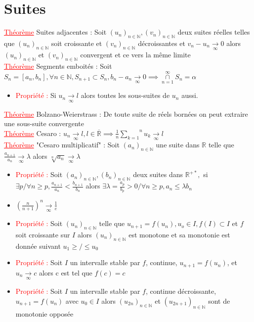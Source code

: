 \documentclass[a4paper, 11pts, french]{article}
\newcommand{\R}{\mathbb{R}}
\newcommand{\N}{\mathbb{N}}
\newcommand{\al}{\alpha}
\newcommand{\la}{\lambda}
\newcommand{\som}[2]{\overset{#2}{\underset{#1}{\sum}}}
\newcommand{\thm}{\textcolor{red}{\underline{Théorème} }}
\newcommand{\ppt}{\textcolor{red}{Propriété : }}
\newcommand{\limit}[1]{\underset{#1}{\rightarrow}}
\newcommand{\inv}[1]{\frac{1}{#1}}
\begin{document}
	\section{Suites}
	 \thm Suites adjacentes : Soit $(u_n)_{n \in \N}, (v_n)_{n \in \N}$ deux suites réelles telles que $(u_n)_{n \in \N}$ soit croissante et $(v_n)_{n \in \N}$ décroissantes et $v_n-u_n\limit{\infty}0$ alors $(u_n)_{n \in \N}$ et $(v_n)_{n \in \N}$ convergent et ce vers la même limite\\
	 \thm Segments emboités : Soit $S_n=[a_n,b_n], \forall n \in \N, S_{n+1} \subset S_n, b_n-a_n \limit{\infty}0 \implies \overset{\infty}{\underset{n=1}{\cap}} S_n={\al}$
	\begin{itemize}
	  \item \ppt Si $u_n \limit{\infty}l$ alors toutes les sous-suites de $u_n$ aussi.
	\end{itemize}
	 \thm Bolzano-Weierstrass : De toute suite de réels bornées on peut extraire une sous-suite convergente \\
	 \thm Cesaro : $u_n \limit{\infty}l, l \in \overline{\R} \implies \inv{n}\som{k=1}{n}u_k \limit{\infty}l$ \\
	 \thm "Cesaro multiplicatif" : Soit $(a_n)_{n \in \N}$ une suite dans $\R$ telle que $\frac{a_{n+1}}{a_n}\limit{\infty}\la$ alors $\sqrt[n]{a_n}\limit{\infty}\la$

	\begin{itemize}
	  \item \ppt Soit $(a_n)_{n \in \N},(b_n)_{n \in \N}$ deux suites dans $\R^{+*},$ si $\exists p / \forall n \geqslant p, \frac{a_{n+1}}{a_n} < \frac{b_{n+1}}{b_n}$ alors $\exists \la = \frac{a_p}{b_p}>0/ \forall n \geqslant p, a_n \leqslant \la b_n$
	  \item $(\frac{n}{n+1})^n\limit{\infty}\inv{e}$
	  \item \ppt Soit $(u_n)_{n \in \N}$ telle que $u_{n+1}=f(u_n), u_o \in I, f(I) \subset I$ et $f$ soit croissante sur $I$ alors $(u_n)_{n \in \N}$ est monotone et sa monotonie est donnée suivant $u_1 \geqslant/\leqslant u_0$
	  \item \ppt Soit $I$ un intervalle stable par $f$, continue, $u_{n+1}=f(u_n)$, et $u_n\limit{\infty}c$ alors c est tel que $f(c)=c$
	  \item \ppt Soit $I$ un intervalle stable par $f$, continue décroissante, $u_{n+1}=f(u_n)$ avec $u_0 \in I$ alors $(u_{2n})_{n \in \N}$ et $(u_{2n+1})_{n \in \N}$ sont de monotonie opposée
	\end{itemize}
\end{document}
